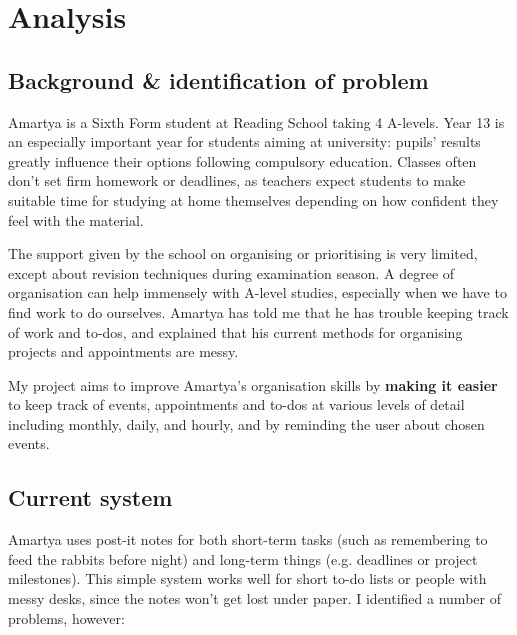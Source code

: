 \section{Analysis}

\subsection{Background \& identification of problem}

Amartya is a Sixth Form student at Reading School taking 4 A-levels.
Year 13 is an especially important year for students aiming at university:
pupils' results greatly influence their options following compulsory
education. Classes often don't set firm homework or deadlines, as teachers
expect students to make suitable time for studying at home themselves depending
on how confident they feel with the material.

The support given by the school on organising or prioritising is very limited,
except about revision techniques during examination season. A degree of
organisation can help immensely with A-level studies, especially when we have to
find work to do ourselves. Amartya has told me that he has trouble keeping track
of work and to-dos, and explained that his current methods for organising
projects and appointments are messy.

My project aims to improve Amartya's organisation skills by \textbf{making it
easier} to keep track of events, appointments and to-dos at various levels of
detail including monthly, daily, and hourly, and by reminding the user about
chosen events.


\subsection{Current system}

Amartya uses post-it notes for both short-term tasks (such as remembering to
feed the rabbits before night) and long-term things (e.g. deadlines or project
milestones). This simple system works well for short to-do lists or people with
messy desks, since the notes won't get lost under paper. I identified a number
of problems, however:

